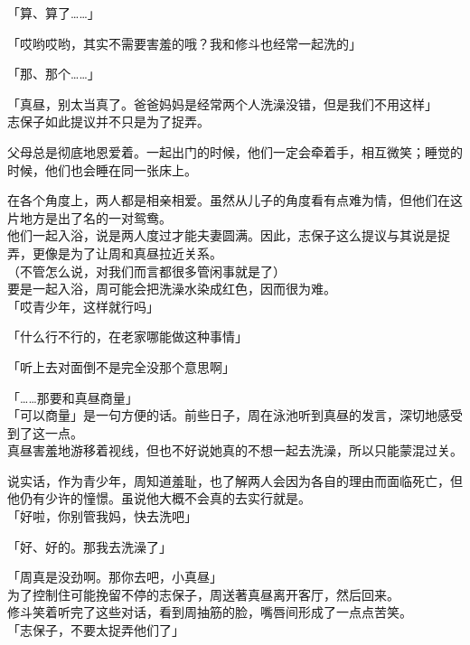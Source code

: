 「算、算了……」

「哎哟哎哟，其实不需要害羞的哦？我和修斗也经常一起洗的」

「那、那个……」

「真昼，别太当真了。爸爸妈妈是经常两个人洗澡没错，但是我们不用这样」\\

志保子如此提议并不只是为了捉弄。

父母总是彻底地恩爱着。一起出门的时候，他们一定会牵着手，相互微笑；睡觉的时候，他们也会睡在同一张床上。

在各个角度上，两人都是相亲相爱。虽然从儿子的角度看有点难为情，但他们在这片地方是出了名的一对鸳鸯。\\

他们一起入浴，说是两人度过才能夫妻圆满。因此，志保子这么提议与其说是捉弄，更像是为了让周和真昼拉近关系。\\

（不管怎么说，对我们而言都很多管闲事就是了）\\

要是一起入浴，周可能会把洗澡水染成红色，因而很为难。\\

「哎青少年，这样就行吗」

「什么行不行的，在老家哪能做这种事情」

「听上去对面倒不是完全没那个意思啊」

「……那要和真昼商量」\\

「可以商量」是一句方便的话。前些日子，周在泳池听到真昼的发言，深切地感受到了这一点。\\

真昼害羞地游移着视线，但也不好说她真的不想一起去洗澡，所以只能蒙混过关。

说实话，作为青少年，周知道羞耻，也了解两人会因为各自的理由而面临死亡，但他仍有少许的憧憬。虽说他大概不会真的去实行就是。\\

「好啦，你别管我妈，快去洗吧」

「好、好的。那我去洗澡了」

「周真是没劲啊。那你去吧，小真昼」\\

为了控制住可能挽留不停的志保子，周送著真昼离开客厅，然后回来。\\

修斗笑着听完了这些对话，看到周抽筋的脸，嘴唇间形成了一点点苦笑。\\

「志保子，不要太捉弄他们了」

